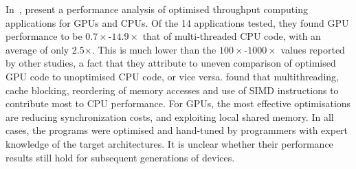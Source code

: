 %





In~\cite{Lee2010}, \citeauthor{Lee2010} present a performance analysis
of optimised throughput computing applications for GPUs and CPUs. Of
the 14 applications tested, they found GPU performance to be
$0.7\times$-$14.9\times$ that of multi-threaded CPU code, with an
average of only 2.5$\times$. This is much lower than the
$100\times$-$1000\times$ values reported by other studies,
a fact that they attribute to uneven comparison of optimised GPU code
to unoptimised CPU code, or vice versa. \citeauthor{Lee2010} found
that multithreading, cache blocking, reordering of memory accesses and
use of SIMD instructions to contribute most to CPU performance. For
GPUs, the most effective optimisations are reducing synchronization
costs, and exploiting local shared memory. In all cases, the programs
were optimised and hand-tuned by programmers with expert knowledge of
the target architectures. It is unclear whether their performance
results still hold for subsequent generations of devices.



